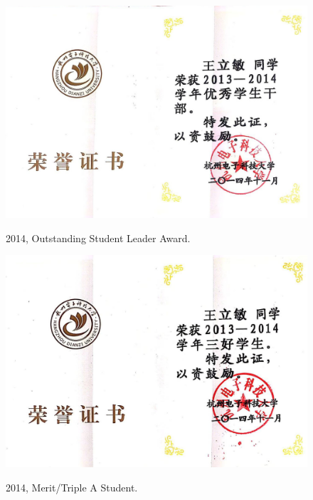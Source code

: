 \documentclass[11pt]{article}
\begin{document}
\begin{figure}[ht]
	\centering
	\includegraphics[width=14cm]{fig/cer6.jpg}\\
	\caption{2014, Outstanding Student Leader Award.}
\end{figure}

\begin{figure}[ht]
	\centering
	\includegraphics[width=14cm]{fig/cer7.jpg}\\
	\caption{2014, Merit/Triple A Student.}
\end{figure}
\end{document}
